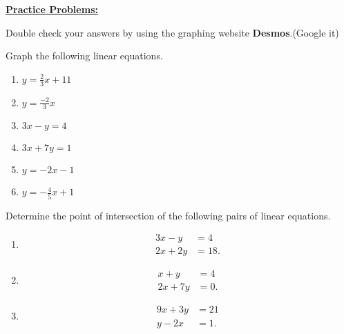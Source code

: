 \documentclass[12pt]{article} %
\begin{document}
\textbf{\underline{\Large{Practice Problems:}}}

Double check your answers by using the graphing website \textbf{Desmos}.(Google it)
\begin{qstn}
	Graph the following linear equations.
	\begin{enumerate}[label=(\alph*)]
		\item $y = \frac{2}{3}x + 11$
		\item $y = \frac{-2}{3}x$
		\item $3x - y = 4$
		\item $3x + 7y = 1$
		\item $y = -2x - 1$
		\item $y = -\frac{4}{5}x + 1$
	\end{enumerate}
\end{qstn}

\begin{qstn}
	Determine the point of intersection of the following pairs of linear equations.
	\begin{enumerate}[label=(\alph*)]
		\item \begin{align*}
			3x - y &= 4\\
			2x + 2y &= 18
		.\end{align*}
		\item \begin{align*}
		  x + y &= 4\\
			2x + 7y &= 0
		.\end{align*}
		\item \begin{align*}
			9x + 3y &= 21\\
			y - 2x &= 1
		.\end{align*}
	\end{enumerate}



\end{qstn}
\end{document}
